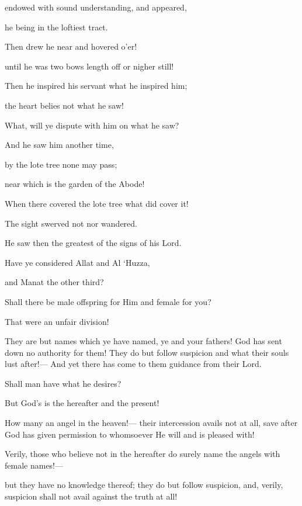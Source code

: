 \documentclass[fontsize=14pt, letterpaper, notitlepage, openany, DIV=12]{scrbook} %
\begin{document}
\noindent[53:6]
endowed with sound understanding, and appeared,

\noindent[53:7]
he being in the loftiest tract.

\noindent[53:8]
Then drew he near and hovered o'er!

\noindent[53:9]
until he was two bows length off or nigher still!

\noindent[53:10]
Then he inspired his servant what he inspired him;

\noindent[53:11]
the heart belies not what he saw!

\noindent[53:12]
What, will ye dispute with him on what he saw?

\noindent[53:13]
And he saw him another time,

\noindent[53:14]
by the lote tree none may pass;

\noindent[53:15]
near which is the garden of the Abode!

\noindent[53:16]
When there covered the lote tree what did cover it!

\noindent[53:17]
The sight swerved not nor wandered.

\noindent[53:18]
He saw then the greatest of the signs of his Lord.

\noindent[53:19]
Have ye considered Allat and Al `Huzza,

\noindent[53:20]
and Manat the other third?

\noindent[53:21]
Shall there be male offspring for Him and female for you?

\noindent[53:22]
That were an unfair division!

\noindent[53:23]
They are but names which ye have named, ye and your fathers! God has sent down no
authority for them! They do but follow suspicion and what their souls lust after!--- And yet there
has come to them guidance from their Lord.

\noindent[53:24]
Shall man have what he desires?

\noindent[53:25]
But God's is the hereafter and the present!

\noindent[53:26]
How many an angel in the heaven!--- their intercession avails not at all, save after God
has given permission to whomsoever He will and is pleased with!

\noindent[53:27]
Verily, those who believe not in the hereafter do surely name the angels with female
names!---

\noindent[53:28]
but they have no knowledge thereof; they do but follow suspicion, and, verily, suspicion
shall not avail against the truth at all!
\end{document}
